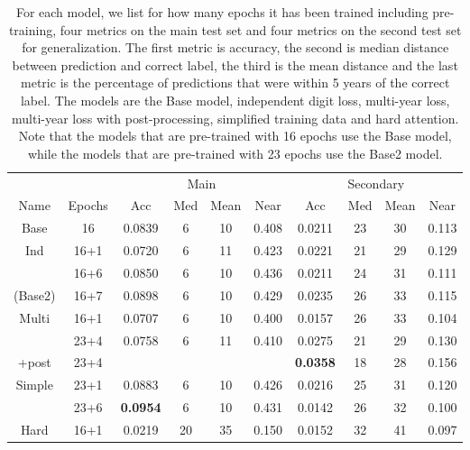 
\begin{table}
  \centering
  \begin{tabular}{|c|c||c|c|c|c||c|c|c|c|}
    \hline
    & & \multicolumn{4}{c||}{Main} & \multicolumn{4}{c|}{Secondary} \\
    Name & Epochs & Acc & Med & Mean & Near & Acc & Med & Mean & Near \\
    \hline
    Base & 16 & 0.0839 & 6 & 10 & 0.408 & 0.0211 & 23 & 30 & 0.113 \\
    \hline
    Ind & 16+1 & 0.0720 & 6 & 11 & 0.423 & 0.0221 & 21 & 29 & 0.129 \\
    & 16+6 & 0.0850 & 6 & 10 & 0.436 & 0.0211 & 24 & 31 & 0.111 \\
    (Base2) & 16+7 & 0.0898 & 6 & 10 & 0.429 & 0.0235 & 26 & 33 & 0.115 \\
    \hline
    Multi & 16+1 & 0.0707 & 6 & 10 & 0.400 & 0.0157 & 26 & 33 & 0.104 \\
    & 23+4 & 0.0758 & 6 & 11 & 0.410 & 0.0275 & 21 & 29 & 0.130 \\
    +post & 23+4 & & & & & \textbf{0.0358} & 18 & 28 & 0.156 \\
    \hline
    Simple & 23+1 & 0.0883 & 6 & 10 & 0.426 & 0.0216 & 25 & 31 & 0.120 \\
    & 23+6 & \textbf{0.0954} & 6 & 10 & 0.431 & 0.0142 & 26 & 32 & 0.100 \\
    \hline
    Hard & 16+1 & 0.0219 & 20 & 35 & 0.150 & 0.0152 & 32 & 41 & 0.097 \\
    \hline
  \end{tabular}
  \caption{For each model, we list for how many epochs it has been trained including pre-training, four metrics on the main test set and four metrics on the second test set for generalization.
  The first metric is accuracy, the second is median distance between prediction and correct label, the third is the mean distance and the last metric is the percentage of predictions that were within 5 years of the correct label.
  The models are the Base model, independent digit loss, multi-year loss, multi-year loss with post-processing, simplified training data and hard attention.
  Note that the models that are pre-trained with 16 epochs use the Base model, while the models that are pre-trained with 23 epochs use the Base2 model.
  }
  \label{tab:model_overview}
\end{table}
